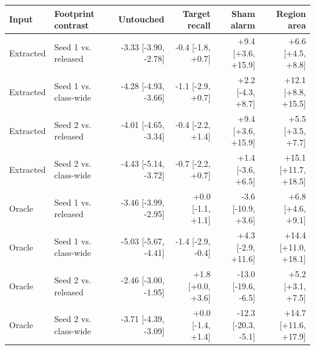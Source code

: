 \begin{tabular}{llrrrr}
\toprule
Input & Footprint contrast & Untouched & Target recall & Sham alarm & Region area \\
\midrule
Extracted & Seed 1 vs. released & -3.33 [-3.90, -2.78] & -0.4 [-1.8, +0.7] & +9.4 [+3.6, +15.9] & +6.6 [+4.5, +8.8] \\
Extracted & Seed 1 vs. class-wide & -4.28 [-4.93, -3.66] & -1.1 [-2.9, +0.7] & +2.2 [-4.3, +8.7] & +12.1 [+8.8, +15.5] \\
Extracted & Seed 2 vs. released & -4.01 [-4.65, -3.34] & -0.4 [-2.2, +1.4] & +9.4 [+3.6, +15.9] & +5.5 [+3.5, +7.7] \\
Extracted & Seed 2 vs. class-wide & -4.43 [-5.14, -3.72] & -0.7 [-2.2, +0.7] & +1.4 [-3.6, +6.5] & +15.1 [+11.7, +18.5] \\
\midrule
Oracle & Seed 1 vs. released & -3.46 [-3.99, -2.95] & +0.0 [-1.1, +1.1] & -3.6 [-10.9, +3.6] & +6.8 [+4.6, +9.1] \\
Oracle & Seed 1 vs. class-wide & -5.03 [-5.67, -4.41] & -1.4 [-2.9, -0.4] & +4.3 [-2.9, +11.6] & +14.4 [+11.0, +18.1] \\
Oracle & Seed 2 vs. released & -2.46 [-3.00, -1.95] & +1.8 [+0.0, +3.6] & -13.0 [-19.6, -6.5] & +5.2 [+3.1, +7.5] \\
Oracle & Seed 2 vs. class-wide & -3.71 [-4.39, -3.09] & +0.0 [-1.4, +1.4] & -12.3 [-20.3, -5.1] & +14.7 [+11.6, +17.9] \\
\bottomrule
\end{tabular}
